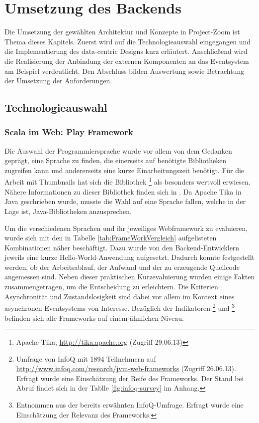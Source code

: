 \chapter{Umsetzung des Backends}

Die Umsetzung der gewählten Architektur und Konzepte in Project-Zoom ist Thema dieses Kapitels. Zuerst wird auf die Technologieauswahl eingegangen und die Implementierung des data-centric Designs kurz erläutert. Anschließend wird die Realisierung der Anbindung der externen Komponenten an das Eventsystem am Beispiel verdeutlicht. Den Abschluss bilden Auswertung sowie Betrachtung der Umsetzung der Anforderungen. 

\section{Technologieauswahl}

\subsection{Scala im Web: Play Framework}
Die Auswahl der Programmiersprache wurde vor allem von dem Gedanken geprägt, eine Sprache zu finden, die einerseits auf benötigte Bibliotheken zugreifen kann und andererseits eine kurze Einarbeitungszeit benötigt. Für die Arbeit mit Thumbnails hat sich die Bibliothek \footnote{Apache Tika, \url{http://tika.apache.org} (Zugriff 29.06.13)} als besonders wertvoll erwiesen. Nähere Informationen zu dieser Bibliothek finden sich in \cite{bp-dome}. Da Apache Tika in Java geschrieben wurde, musste die Wahl auf eine Sprache fallen, welche in der Lage ist, Java-Bibliotheken anzusprechen. 

Um die verschiedenen Sprachen und ihr jeweiliges Webframework zu evaluieren, wurde sich mit den in Tabelle \ref{tab:FrameWorkVergleich} aufgelisteten Kombinationen näher beschäftigt. Dazu wurde von den Backend-Entwicklern jeweils eine kurze Hello-World-Anwendung aufgesetzt. Dadurch konnte festgestellt werden, ob der Arbeitsablauf, der Aufwand und der zu erzeugende Quellcode angemessen sind. Neben dieser praktischen Kurzevaluierung wurden einige Fakten zusammengetragen, um die Entscheidung zu erleichtern. Die Kriterien Asynchronität und Zustandslosigkeit sind dabei vor allem im Kontext eines asynchronen Eventsystems von Interesse. Bezüglich der Indikatoren \footnote{Umfrage von InfoQ mit 1894 Teilnehmern auf \url{http://www.infoq.com/research/jvm-web-frameworks} (Zugriff 26.06.13). Erfragt wurde eine Einschätzung der Reife des Frameworks. Der Stand bei Abruf findet sich in der Tablle \ref{fig:infoq-survey} im Anhang.} und \footnote{Entnommen aus der bereits erwähnten InfoQ-Umfrage. Erfragt wurde eine Einschätzung der Relevanz des Frameworks.} befinden sich alle Frameworks auf einem ähnlichen Niveau. 

